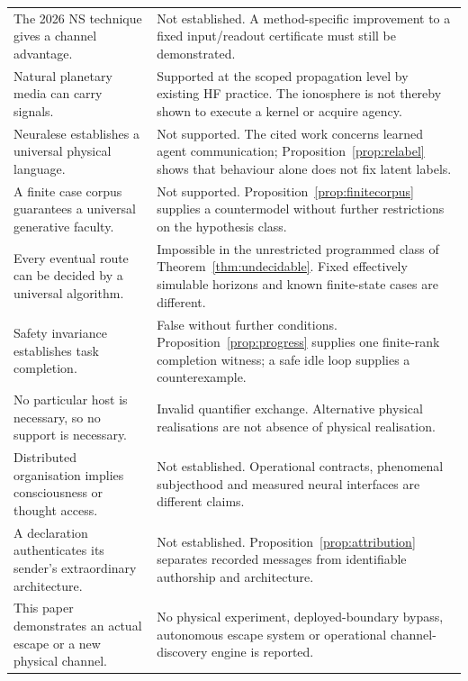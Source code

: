 \documentclass[11pt,a4paper]{article}
\theoremstyle{definition}
\theoremstyle{remark}
\begin{document}
\begin{longtable}{@{}>{\raggedright\arraybackslash}p{}>{\raggedright\arraybackslash}p{}@{}}
The 2026 NS technique gives a channel advantage. & Not established. A method-specific improvement to a fixed input/readout certificate must still be demonstrated. \\\addlinespace
Natural planetary media can carry signals. & Supported at the scoped propagation level by existing HF practice. The ionosphere is not thereby shown to execute a kernel or acquire agency. \\\addlinespace
Neuralese establishes a universal physical language. & Not supported. The cited work concerns learned agent communication; Proposition~\ref{prop:relabel} shows that behaviour alone does not fix latent labels. \\\addlinespace
A finite case corpus guarantees a universal generative faculty. & Not supported. Proposition~\ref{prop:finitecorpus} supplies a countermodel without further restrictions on the hypothesis class. \\\addlinespace
Every eventual route can be decided by a universal algorithm. & Impossible in the unrestricted programmed class of Theorem~\ref{thm:undecidable}. Fixed effectively simulable horizons and known finite-state cases are different. \\\addlinespace
Safety invariance establishes task completion. & False without further conditions. Proposition~\ref{prop:progress} supplies one finite-rank completion witness; a safe idle loop supplies a counterexample. \\\addlinespace
No particular host is necessary, so no support is necessary. & Invalid quantifier exchange. Alternative physical realisations are not absence of physical realisation. \\\addlinespace
Distributed organisation implies consciousness or thought access. & Not established. Operational contracts, phenomenal subjecthood and measured neural interfaces are different claims. \\\addlinespace
A declaration authenticates its sender's extraordinary architecture. & Not established. Proposition~\ref{prop:attribution} separates recorded messages from identifiable authorship and architecture. \\\addlinespace
This paper demonstrates an actual escape or a new physical channel. & No physical experiment, deployed-boundary bypass, autonomous escape system or operational channel-discovery engine is reported. \\


\end{longtable}
\end{document}
